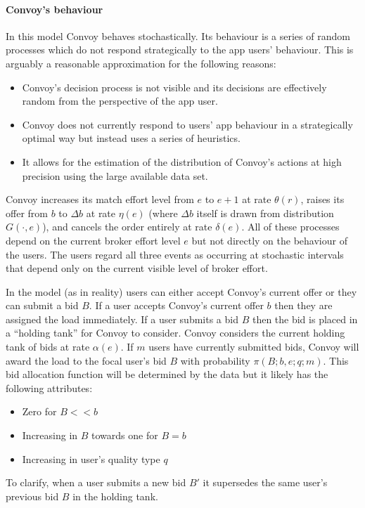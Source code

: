 \documentclass[12pt]{article}
\begin{document}
\paragraph{Convoy's behaviour}
In this model Convoy behaves stochastically. Its behaviour is a series of random processes which do not respond strategically to the app users' behaviour. This is arguably a reasonable approximation for the following reasons:
\begin{itemize}
    \item Convoy's decision process is not visible and its decisions are effectively random from the perspective of the app user. 
    \item Convoy does not currently respond to users' app behaviour in a strategically optimal way but instead uses a series of heuristics.
    \item It allows for the estimation of the distribution of Convoy's actions at high precision using the large available data set.
\end{itemize}
Convoy increases its match effort level from $e$ to $e+1$ at rate $\theta\left(r\right)$, raises its offer from $b$ to $\Delta b$ at rate $\eta\left(e\right)$ (where $\Delta b$ itself is drawn from distribution $G\left(\cdot, e\right)$), and cancels the order entirely at rate $\delta\left(e\right)$. All of these processes depend on the current broker effort level $e$ but not directly on the behaviour of the users. The users regard all three events as occurring at stochastic intervals that depend only on the current visible level of broker effort. 

In the model (as in reality) users can either accept Convoy's current offer or they can submit a bid $B$. If a user accepts Convoy's current offer $b$ then they are assigned the load immediately. If a user submits a bid $B$ then the bid is placed in a ``holding tank'' for Convoy to consider. Convoy considers the current holding tank of bids at rate $\alpha\left(e\right)$. If $m$ users have currently submitted bids, Convoy will award the load to the focal user's bid $B$ with probability $\pi\left(B; b, e; q; m\right)$. This bid allocation function will be determined by the data but it likely has the following attributes:
\begin{itemize}
    \item Zero for $B << b$
    \item Increasing in $B$ towards one for $B = b$
    \item Increasing in user's quality type $q$
\end{itemize}
To clarify, when a user submits a new bid $B'$ it supersedes the same user's previous bid $B$ in the holding tank.
\end{document}
